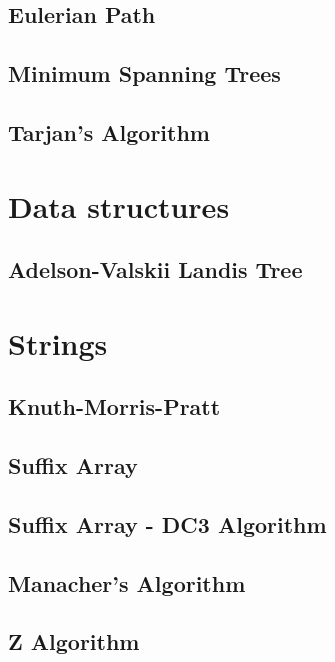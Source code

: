 \subsection{Eulerian Path}
\raggedbottom
\hrulefill
\subsection{Minimum Spanning Trees}
\raggedbottom
\hrulefill
\subsection{Tarjan's Algorithm}
\raggedbottom
\hrulefill

\section{Data structures}
\subsection{Adelson-Valskii Landis Tree}
\raggedbottom
\hrulefill

\section{Strings}
\subsection{Knuth-Morris-Pratt}
\raggedbottom
\hrulefill
\subsection{Suffix Array}
\raggedbottom
\hrulefill
\subsection{Suffix Array - DC3 Algorithm}
\raggedbottom
\hrulefill
\subsection{Manacher's Algorithm}
\raggedbottom
\hrulefill
\subsection{Z Algorithm}
\raggedbottom
\hrulefill

